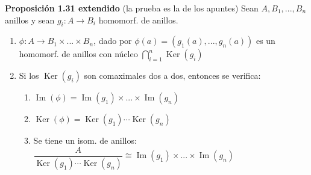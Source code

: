 \documentclass[openany]{book}
\begin{document}
\begin{proposition}
    \textbf{Proposición 1.31 extendido} (la prueba es la de los apuntes)
    Sean $ A,B_1,...,B_n $ anillos y sean $ g_{i}:A\to B_i $ homomorf. de anillos.
    \begin{enumerate}
        \item $ \phi:A\to B_1\times ...\times B_n $, dado por $ \phi(a) = (g_1(a),...,g_n(a)) $ es un homomorf. de anillos con núcleo $ \bigcap_{i=1}^{n}\operatorname{Ker}(g_i) $
        \item Si los $ \operatorname{Ker}(g_i) $ son comaximales dos a dos, entonces se verifica:
            \begin{enumerate}
                \item $ \operatorname{Im}(\phi) = \operatorname{Im}(g_1)\times...\times \operatorname{Im}(g_n)$
                \item $ \operatorname{Ker}(\phi) = \operatorname{Ker}(g_1)\cdots \operatorname{Ker}(g_n) $
                \item Se tiene un isom. de anillos: $ \dfrac{A}{\operatorname{Ker}(g_1)\cdots\operatorname{Ker}(g_n)} \cong \operatorname{Im}(g_1) \times ...\times \operatorname{Im}(g_n) $
            \end{enumerate} 
    \end{enumerate}

\end{proposition}
\end{document}
